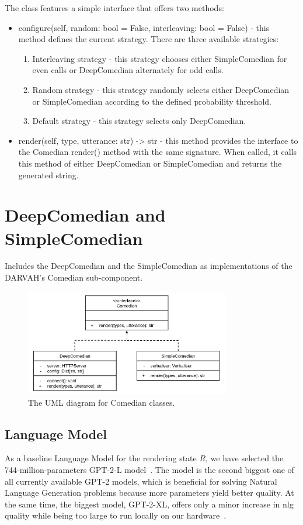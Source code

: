 The class features a simple interface that offers two methods:
\begin{itemize}
    \item configure(self, random: bool = False, interleaving: bool = False) - this method defines the current strategy. There are three available strategies:
    \begin{enumerate}
        \item Interleaving strategy - this strategy chooses either SimpleComedian for even calls or DeepComedian alternately for odd calls.
        \item Random strategy - this strategy randomly selects either DeepComedian or SimpleComedian according to the defined probability threshold.
        \item Default strategy - this strategy selects only DeepComedian.
    \end{enumerate}
    \item render(self, type, utterance: str) -> str - this method provides the interface to the Comedian render() method with the same signature. When called, it calls this method of either DeepComedian or SimpleComedian and returns the generated string.
\end{itemize}

\section{DeepComedian and SimpleComedian}\label{section:deepc}
Includes the DeepComedian and the SimpleComedian as implementations of the DARVAH's Comedian sub-component.

\begin{figure}[htpb]
  \centering
  \includegraphics[width=0.8\textwidth]{figures/umlcomed.png}
  \caption{The UML diagram for Comedian classes.} \label{fig:umlci}
\end{figure}

\subsection{Language Model}
As a baseline Language Model for the rendering state \( R\), we have selected the 744-million-parameters GPT-2-L model~\parencite{gpt2}. The model is the second biggest one of all currently available GPT-2 models, which is beneficial for solving Natural Language Generation problems because more parameters yield better quality. At the same time, the biggest model, GPT-2-XL, offers only a minor increase in \acrshort{nlg} quality while being too large to run locally on our hardware~\parencite{radford2019language}.

